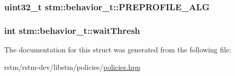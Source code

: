 \hypertarget{structstm_1_1behavior__t_ab914d48d4a039a0b4b9dbbdd0f08462d}{
\subsubsection[{P\-R\-E\-P\-R\-O\-F\-I\-L\-E\-\_\-\-A\-L\-G}]{\setlength{\rightskip}{0pt plus 5cm}uint32\-\_\-t stm\-::behavior\-\_\-t\-::\-P\-R\-E\-P\-R\-O\-F\-I\-L\-E\-\_\-\-A\-L\-G}}\label{structstm_1_1behavior__t_ab914d48d4a039a0b4b9dbbdd0f08462d}
\hypertarget{structstm_1_1behavior__t_a64fe29181a677b2617b5e954a78c33b8}{
\subsubsection[{wait\-Thresh}]{\setlength{\rightskip}{0pt plus 5cm}int stm\-::behavior\-\_\-t\-::wait\-Thresh}}\label{structstm_1_1behavior__t_a64fe29181a677b2617b5e954a78c33b8}


The documentation for this struct was generated from the following file\-:\begin{DoxyCompactItemize}
\item 
rstm/rstm-\/dev/libstm/policies/\hyperlink{policies_8hpp}{policies.\-hpp}\end{DoxyCompactItemize}
